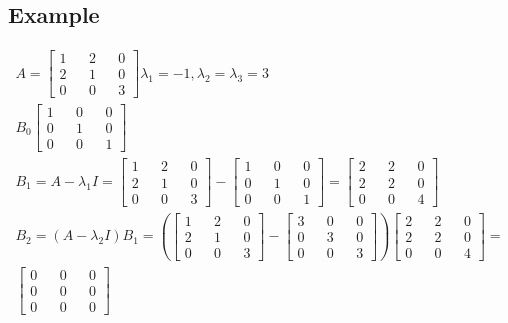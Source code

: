 \documentclass[fleqn]{report}
\newcommand{\equations} [1] {
\begin{gather*}
#1
\end{gather*}
}
\begin{document}
\subsection{Example}
\equations{
A = 
\begin{bmatrix}
1 && 2 && 0 \\
2 && 1 && 0 \\
0 && 0 && 3 
\end{bmatrix}
\lambda_1 = -1 , \lambda_2 = \lambda_3 = 3
\\
B_0
\begin{bmatrix}
1 && 0 && 0 \\
0 && 1 && 0 \\
0 && 0 && 1 
\end{bmatrix}
\\
B_1 = A - \lambda_1 I = 
\begin{bmatrix}
1 && 2 && 0 \\
2 && 1 && 0 \\
0 && 0 && 3 
\end{bmatrix}
-
\begin{bmatrix}
1 && 0 && 0 \\
0 && 1 && 0 \\
0 && 0 && 1 
\end{bmatrix}
=
\begin{bmatrix}
2 && 2 && 0 \\
2 && 2 && 0 \\
0 && 0 && 4
\end{bmatrix}
\\
B_2 = (A - \lambda_2 I) B_1 = 
(
\begin{bmatrix}
1 && 2 && 0 \\
2 && 1 && 0 \\
0 && 0 && 3 
\end{bmatrix}
-
\begin{bmatrix}
3 && 0 && 0 \\
0 && 3 && 0 \\
0 && 0 && 3
\end{bmatrix}
)
\begin{bmatrix}
2 && 2 && 0 \\
2 && 2 && 0 \\
0 && 0 && 4
\end{bmatrix}
=
\\
\begin{bmatrix}
0 && 0 && 0 \\
0 && 0 && 0 \\
0 && 0 && 0
\end{bmatrix}
\\
}
\end{document}
